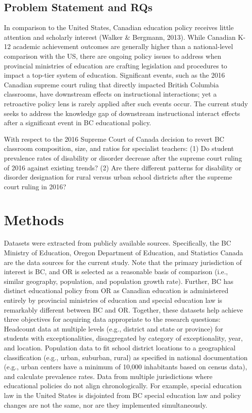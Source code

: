 \documentclass[
  english,
  man]{apa6}
\begin{document}
\hypertarget{problem-statement-and-rqs}{%
\subsection{Problem Statement and RQs}\label{problem-statement-and-rqs}}

In comparison to the United States, Canadian education policy receives little attention and scholarly interest (Walker \& Bergmann, 2013). While Canadian K-12 academic achievement outcomes are generally higher than a national-level comparison with the US, there are ongoing policy issues to address when provincial ministries of education are crafting legislation and procedures to impact a top-tier system of education. Significant events, such as the 2016 Canadian supreme court ruling that directly impacted British Columbia classrooms, have downstream effects on instructional interactions; yet a retroactive policy lens is rarely applied after such events occur. The current study seeks to address the knowledge gap of downstream instructional interact effects after a significant event in BC educational policy.

With respect to the 2016 Supreme Court of Canada decision to revert BC classroom composition, size, and ratios for specialist teachers:
(1) Do student prevalence rates of disability or disorder decrease after the supreme court ruling of 2016 against existing trends?
(2) Are there different patterns for disability or disorder designation for rural versus urban school districts after the supreme court ruling in 2016?

\hypertarget{methods}{%
\section{Methods}\label{methods}}

Datasets were extracted from publicly available sources. Specifically, the BC Ministry of Education, Oregon Department of Education, and Statistics Canada are the data sources for the current study. Note that the primary jurisdiction of interest is BC, and OR is selected as a reasonable basis of comparison (i.e., similar geography, population, and population growth rate). Further, BC has distinct educational policy from OR as Canadian education is administered entirely by provincial ministries of education and special education law is remarkably different between BC and OR. Together, these datasets help achieve three objectives for acquiring data appropriate to the research questions:
Headcount data at multiple levels (e.g., district and state or province) for students with exceptionalities, disaggregated by category of exceptionality, year, and location.
Population data to fit school district locations to a geographical classification (e.g., urban, suburban, rural) as specified in national documentation (e.g., urban centers have a minimum of 10,000 inhabitants based on census data), and calculate prevalence rates.
Data from multiple jurisdictions where educational policies do not align chronologically. For example, special education law in the United States is disjointed from BC special education law and policy changes are not the same, nor are they implemented simultaneously.
\end{document}

